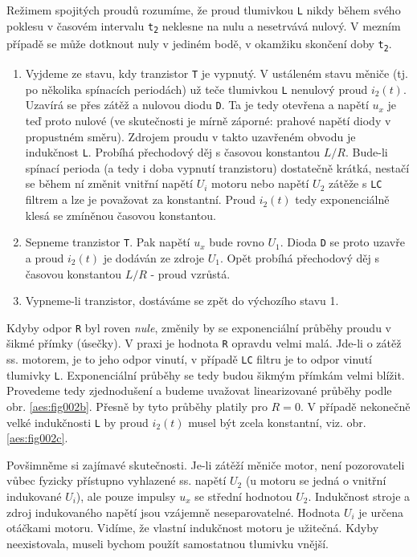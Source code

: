       Režimem spojitých proudů rozumíme, že proud tlumivkou \texttt{L} nikdy během svého poklesu v 
      časovém intervalu \texttt{t\textsubscript{2}} neklesne na nulu a nesetrvává nulový. V mezním 
      případě se může dotknout nuly v jediném bodě, v okamžiku skončení doby 
      \texttt{t\textsubscript{2}}.
      \begin{enumerate}[noitemsep]
        \item Vyjdeme ze stavu, kdy tranzistor \texttt{T} je vypnutý. V ustáleném stavu měniče (tj. 
              po několika spínacích periodách) už teče tlumivkou \texttt{L} nenulový proud 
              \(i_2(t)\). Uzavírá se přes zátěž a nulovou diodu \texttt{D}. Ta je tedy otevřena a 
              napětí \(u_x\) je teď proto nulové (ve skutečnosti je mírně záporné: prahové napětí 
              diody v propustném směru). Zdrojem proudu v takto uzavřeném obvodu je indukčnost 
              \texttt{L}. Probíhá přechodový děj s časovou konstantou \(L/R\). Bude-li spínací 
              perioda (a tedy i doba vypnutí tranzistoru) dostatečně krátká, nestačí se během ní 
              změnit vnitřní napětí \(U_i\) motoru nebo napětí \(U_2\) zátěže s \texttt{LC} filtrem 
              a lze je považovat za konstantní. Proud \(i_2(t)\) tedy exponenciálně klesá se 
              zmíněnou časovou konstantou.
        \item Sepneme tranzistor \texttt{T}. Pak napětí \(u_x\) bude rovno \(U_1\). Dioda 
              \texttt{D} se proto uzavře a proud \(i_2(t)\) je dodáván ze zdroje \(U_1\). Opět 
              probíhá přechodový děj s časovou konstantou \(L/R\) - proud vzrůstá.
        \item Vypneme-li tranzistor, dostáváme se zpět do výchozího stavu 1.
      \end{enumerate}
      
      Kdyby odpor \texttt{R} byl roven \emph{nule}, změnily by se exponenciální průběhy proudu v 
      šikmé přímky (úsečky). V praxi je hodnota \texttt{R} opravdu velmi malá. Jde-li o zátěž ss. 
      motorem, je to jeho odpor vinutí, v případě \texttt{LC} filtru je to odpor vinutí tlumivky 
      \texttt{L}. Exponenciální průběhy se tedy budou šikmým přímkám velmi blížit. Provedeme tedy 
      zjednodušení a budeme uvažovat linearizované průběhy podle obr. \ref{aes:fig002b}.
      Přesně by tyto průběhy platily pro \(R = 0\). V případě nekonečně velké indukčnosti 
      \texttt{L} by proud \(i_2(t)\) musel být zcela konstantní, viz. obr. \ref{aes:fig002c}.
      
      \begin{note}
        Povšimněme si zajímavé skutečnosti. Je-li zátěží měniče motor, není pozorovateli vůbec 
        fyzicky přístupno vyhlazené ss. napětí \(U_2\) (u motoru se jedná o vnitřní indukované 
        \(U_i\)), ale pouze impulsy \(u_x\) se střední hodnotou \(U_2\). Indukčnost stroje a zdroj 
        indukovaného napětí jsou vzájemně neseparovatelné. Hodnota \(U_i\) je určena otáčkami 
        motoru. Vidíme, že vlastní indukčnost motoru je užitečná. Kdyby neexistovala, museli bychom 
        použít samostatnou tlumivku vnější.
      \end{note}
      
